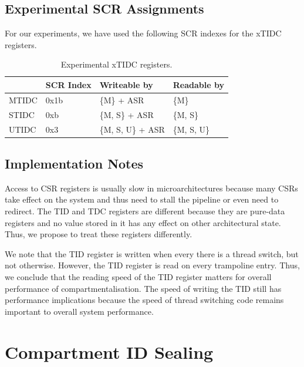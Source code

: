\subsection{Experimental SCR Assignments}

For our experiments, we have used the following SCR indexes for the xTIDC registers.

\begin{table}
  \begin{center}
  \begin{tabular}{ l | l | l | l }
   \toprule
          & SCR Index & Writeable by          & Readable by \\ \midrule
   MTIDC  & 0x1b      & \{M\} + ASR           & \{M\} \\
   STIDC  & 0xb       & \{M, S\} + ASR        & \{M, S\} \\
   UTIDC  & 0x3       & \{M, S, U\} + ASR     & \{M, S, U\} \\ \bottomrule
  \end{tabular}
  \end{center}
  \caption{Experimental xTIDC registers.}
  \label{tab:xtidc-registers}
\end{table}

\subsection{Implementation Notes}

Access to CSR registers is usually slow in microarchitectures because many CSRs take effect on the system and thus need to stall the pipeline or even need to redirect.
The TID and TDC registers are different because they are pure-data registers and no value stored in it has any effect on other architectural state.
Thus, we propose to treat these registers differently.

We note that the TID register is written when every there is a thread switch, but not otherwise.
However, the TID register is read on every trampoline entry.
Thus, we conclude that the reading speed of the TID register matters for overall performance of compartmentalisation.
The speed of writing the TID still has performance implications because the speed of thread switching code remains important to overall system performance.


\section{Compartment ID Sealing} %

